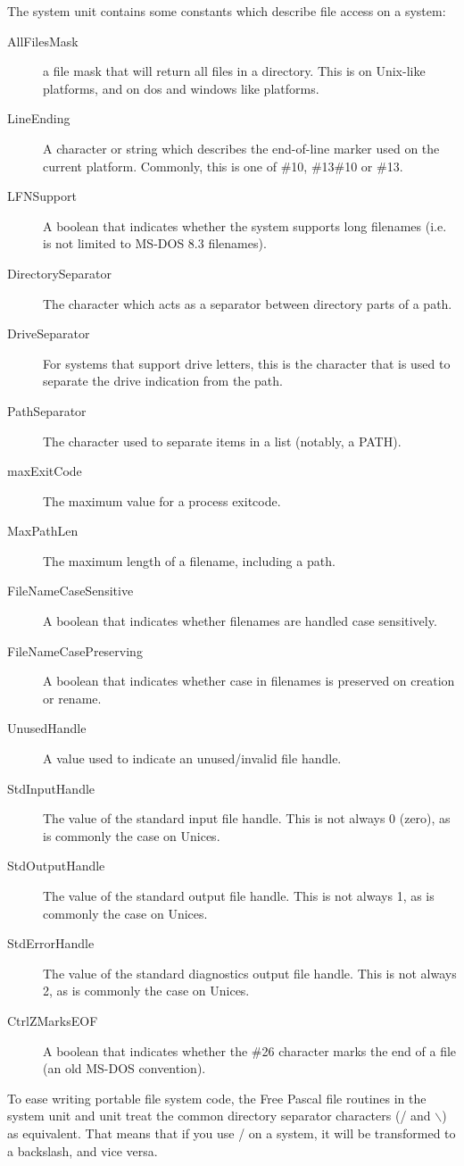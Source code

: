 The system unit contains some constants which describe file access on a system:
\begin{description}
\item[AllFilesMask] a file mask that will return all files in a directory.
This is \var{*} on Unix-like platforms, and  on dos and windows
like platforms.
\item[LineEnding] A character or string which describes the end-of-line marker
used on the current platform. Commonly, this is one of \#10, \#13\#10 or \#13.
\item[LFNSupport] A boolean that indicates whether the system supports long filenames
(i.e. is not limited to MS-DOS 8.3 filenames).
\item[DirectorySeparator] The character which acts as a separator between directory parts of a path.
\item[DriveSeparator] For systems that support drive letters, this is the character that
is used to separate the drive indication from the path.
\item[PathSeparator] The character used to separate items in a list (notably, a PATH).
\item[maxExitCode] The maximum value for a process exitcode.
\item[MaxPathLen] The maximum length of a filename, including a path.
\item[FileNameCaseSensitive] A boolean that indicates whether filenames are handled case sensitively.
\item[FileNameCasePreserving] A boolean that indicates whether case in filenames is preserved on creation or rename.
\item[UnusedHandle] A value used to indicate an unused/invalid file handle.
\item[StdInputHandle] The value of the standard input file handle.
This is not always 0 (zero), as is commonly the case on Unices.
\item[StdOutputHandle] The value of the standard output file handle.
This is not always 1, as is commonly the case on Unices.
\item[StdErrorHandle] The value of the standard diagnostics output file handle.
This is not always 2, as is commonly the case on Unices.
\item[CtrlZMarksEOF] A boolean that indicates whether the \#26 character marks the end of a file
(an old MS-DOS convention).
\end{description}

To ease writing portable file system code, the Free Pascal file routines in
the system unit and  unit treat the common directory separator
characters (/ and $\backslash$) as equivalent. That means that if you use / on a \windows
system, it will be transformed to a backslash, and vice versa.

